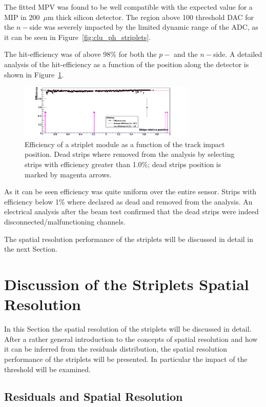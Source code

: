 The fitted MPV was found to be well compatible with the expected  value for a MIP in 200~$\mu$m 
thick silicon detector. The region above 100 threshold DAC for the $n-$side was severely impacted 
by the limited dynamic range of the ADC, as it can be seen in Figure~\ref{fig:clu_ph_striplets}.

The hit-efficiency was of above 98\% for both the $p-$ and the $n-$side. A detailed analysis 
of the hit-efficiency as a function of the position along the detector is shown in 
Figure~\ref{fig:striplets_eff}.
\begin{figure}[!htpb]
\centering
\includegraphics[width=0.75\textwidth]{striplets_eff.png}
\caption{\label{fig:striplets_eff}Efficiency of a striplet module as a function of the track impact position. 
Dead strips where removed from the analysis by selecting strips with efficiency greater than 1.0\%; 
dead strips position is marked by magenta arrows.}
\end{figure}

As it can be seen efficiency was quite uniform
over the entire sensor. Strips with efficiency below 1\% where declared as dead and removed from the 
analysis. An electrical analysis after the beam test confirmed that  the dead strips 
were indeed disconnected/malfunctioning channels. 

The spatial resolution performance of the striplets will be discussed in detail in the next Section.

\section{Discussion of the Striplets Spatial Resolution}
\label{sec:striplets_res}

In this Section the spatial resolution of the striplets will be discussed in detail. After a rather general introduction to the concepts of spatial resolution 
and how it can be inferred from the residuals distribution, the spatial 
resolution performance of the striplets will be presented. In particular 
the impact of the threshold will be examined.

\subsection{Residuals and Spatial Resolution}


